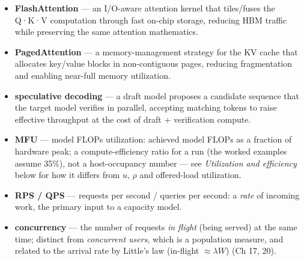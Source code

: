 \begin{itemize}
\item \textbf{FlashAttention} — an I/O-aware attention kernel that tiles/fuses the Q·K·V computation through fast on-chip storage, reducing HBM traffic while preserving the same attention mathematics.
\item \textbf{PagedAttention} — a memory-management strategy for the KV cache that allocates key/value blocks in non-contiguous pages, reducing fragmentation and enabling near-full memory utilization.
\item \textbf{speculative decoding} — a draft model proposes a candidate sequence that the target model verifies in parallel, accepting matching tokens to raise effective throughput at the cost of draft + verification compute.
\item \textbf{MFU} — model FLOPs utilization: achieved model FLOPs as a fraction of hardware peak; a compute-efficiency ratio for a run (the worked examples assume 35\%), not a host-occupancy number — see \emph{Utilization and efficiency} below for how it differs from $u$, $\rho$ and offered-load utilization.
\item \textbf{RPS / QPS} — requests per second / queries per second: a \emph{rate} of incoming work, the primary input to a capacity model.
\item \textbf{concurrency} — the number of requests \emph{in flight} (being served) at the same time; distinct from \emph{concurrent users}, which is a population measure, and related to the arrival rate by Little's law (in-flight $\approx \lambda W$) (Ch 17, 20).
\end{itemize}

